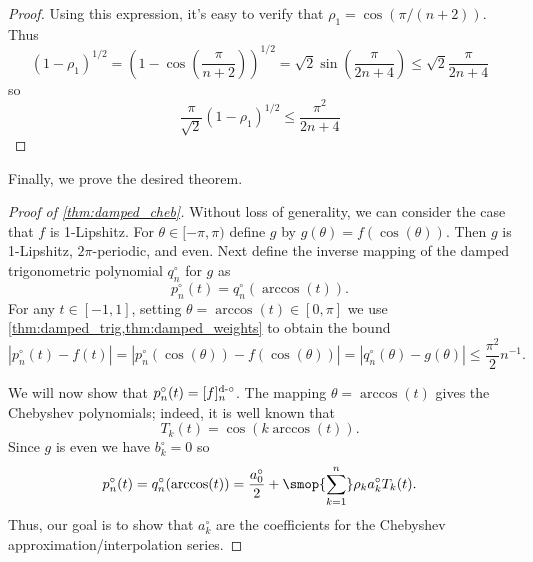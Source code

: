 \begin{proof}
    Using this expression, it's easy to verify that \( \rho_1 = \cos(\pi / (n+2)) \).
    Thus
    \begin{equation*}
        (1-\rho_{1})^{1/2} 
        = \left( 1 - \cos \left( \frac{\pi}{n+2} \right) \right)^{1/2}
        = \sqrt{2} \sin \left( \frac{\pi}{2n+4} \right)
        \leq \sqrt{2} \frac{\pi}{2n+4}
    \end{equation*}
    so
    \begin{equation*}
        \frac{\pi}{\sqrt{2}} ( 1 - \rho_{1})^{1/2}
        \leq \frac{\pi^2}{2n+4}
        \tag*{\qedhere}
    \end{equation*} 
\end{proof}

Finally, we prove the desired theorem.
\begin{proof}[Proof of \cref{thm:damped_cheb}]

    Without loss of generality, we can consider the case that \( f \) is 1-Lipshitz.
    For \( \theta \in [-\pi,\pi) \) define \( g \) by \( g(\theta) = f(\cos(\theta)) \).
    Then \( g \) is 1-Lipshitz, \( 2\pi \)-periodic, and even. %
    Next define the inverse mapping of the damped trigonometric polynomial \( q_n^\circ \) for \( g \) as
    \begin{equation*}
        p_n^\circ(t) = q_n^\circ(\arccos(t)).
    \end{equation*}
    For any \( t\in [-1,1] \), setting \( \theta = \arccos(t) \in [0,\pi] \) we use \cref{thm:damped_trig,thm:damped_weights} to obtain the bound
    \begin{equation*}
        | p_n^\circ(t) - f(t) |
        = | p_n^\circ(\cos(\theta)) - f(\cos(\theta)) |
        = | q_n^\circ(\theta) - g(\theta) |
        \leq \frac{\pi^2}{2} n^{-1}.
    \end{equation*}

    We will now show that \( p_n^\circ(t) = [f]_n^{\textup{d-}\circ} \).
    The mapping \( \theta = \arccos(t) \) gives the Chebyshev polynomials; indeed, it is well known that
    \begin{equation*}
        T_k(t) = \cos(k\arccos(t)).
    \end{equation*}
    Since \( g \) is even we have \( b_k^\circ = 0 \) so 
    \begin{equation*}
        p_n^\circ(t) 
        = q_n^\circ(\arccos(t)) 
        = \frac{a_0^\circ}{2} + \smop{\sum_{k=1}^{n}} \rho_k a_k^\circ T_k(t).
    \end{equation*}
    Thus, our goal is to show that \( a_k^\circ \) are the coefficients for the Chebyshev approximation/interpolation series.


\end{proof}
